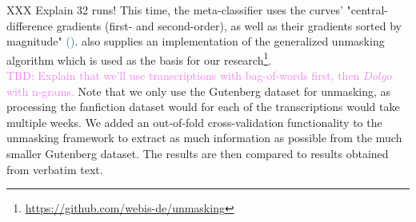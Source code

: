 XXX Explain 32 runs!
This time, the meta-classifier uses the curves' "central-difference gradients (first- and second-order), as well as their gradients sorted by magnitude" \textcolor{teal}{(\cite{bevendorff2019unmaskingShortTexts})}.
\cite{bevendorff2019unmaskingShortTexts} also supplies an implementation of the generalized unmasking algorithm which is used as the basis for our research\footnote{\url{https://github.com/webis-de/unmasking}}.\\
\textcolor{violet}{TBD: Explain that we'll use transcriptions with bag-of-words first, then $Dolgo$ with n-grams.}
Note that we only use the Gutenberg dataset for unmasking, as processing the fanfiction dataset would for each of the transcriptions would take multiple weeks.
We added an out-of-fold cross-validation functionality to the unmasking framework to extract as much information as possible from the much smaller Gutenberg dataset.
The results are then compared to results obtained from verbatim text.


